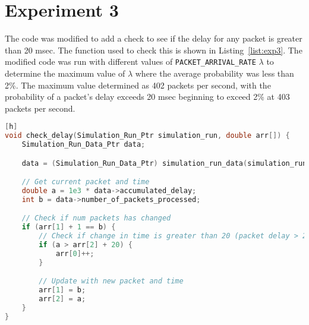 \section*{Experiment 3}

The code was modified to add a check to see if the delay for any packet is greater than 20 msec. The function used to check this is shown in Listing~\ref{list:exp3}. The modified code was run with different values of \texttt{PACKET\_ARRIVAL\_RATE} $\lambda$ to determine the maximum value of $\lambda$ where the average probability was less than 2\%. The maximum value determined as 402 packets per second, with the probability of a packet's delay exceeds 20 msec beginning to exceed 2\% at 403 packets per second.

\begin{lstlisting}[gobble=8, language=C, caption={Modifications to Experiment 3 Code}, label={list:exp3}][h]
void check_delay(Simulation_Run_Ptr simulation_run, double arr[]) {
    Simulation_Run_Data_Ptr data;

    data = (Simulation_Run_Data_Ptr) simulation_run_data(simulation_run);

    // Get current packet and time
    double a = 1e3 * data->accumulated_delay;
    int b = data->number_of_packets_processed;

    // Check if num packets has changed
    if (arr[1] + 1 == b) {
        // Check if change in time is greater than 20 (packet delay > 20 msec)
        if (a > arr[2] + 20) {
            arr[0]++;
        }

        // Update with new packet and time
        arr[1] = b;
        arr[2] = a;
    }
}
\end{lstlisting}